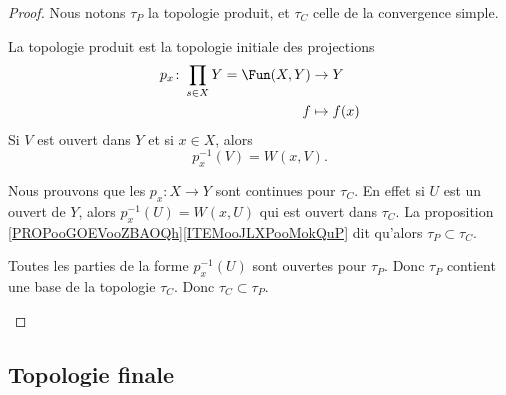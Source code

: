 \begin{proof}
	Nous notons \( \tau_P\) la topologie produit, et \( \tau_C\) celle de la convergence simple.

	\begin{subproof}


		La topologie produit est la topologie initiale des projections
		\begin{equation}
			\begin{aligned}
				p_x\colon \prod_{s\in X}Y=\Fun(X,Y) & \to Y        \\
				f                                   & \mapsto f(x)
			\end{aligned}
		\end{equation}
		Si \( V\) est ouvert dans \( Y\) et si \( x\in X\), alors
		\begin{equation}
			p_x^{-1}(V)=W(x,V).
		\end{equation}

		Nous prouvons que les \(p_x \colon X\to Y  \) sont continues pour \( \tau_C\). En effet si \( U\) est un ouvert de \( Y\), alors \( p_x^{-1}(U)=W(x,U)\) qui est ouvert dans \( \tau_C\). La proposition \ref{PROPooGOEVooZBAOQh}\ref{ITEMooJLXPooMokQuP} dit qu'alors \( \tau_P\subset\tau_C\).

		Toutes les parties de la forme \( p_x^{-1}(U)\) sont ouvertes pour \( \tau_P\). Donc \( \tau_P\) contient une base de la topologie \( \tau_C\). Donc \( \tau_C\subset\tau_P\).
	\end{subproof}
\end{proof}

\subsection{Topologie finale}

